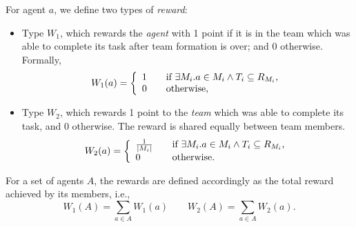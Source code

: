 \documentclass{llncs}
\begin{document}
\begin{definition}[Rewards]
For agent $a$, we define two types of \emph{reward}:
\begin{itemize}
    \item Type $W_1$, which rewards the \emph{agent} with 1 point if it is in the team which was able to complete its task after team formation is over; and 0 otherwise. Formally,
    \begin{equation} \label{eq:w1agent}
W_1(a) = \left\{
  \begin{array}{l l}
    1 & \quad \text{if $\exists M_i . a \in M_i \wedge T_i \subseteq R_{M_i}$,}\\
    0 & \quad \text{otherwise,}\\
  \end{array} \right.
\end{equation}
    \item Type $W_2$, which rewards 1 point to the \emph{team} which was able to complete its task, and 0 otherwise. The reward is shared equally between team members.
\begin{equation}
W_2(a) = \left\{
  \begin{array}{l l}
    \frac{1}{|M_i|} & \quad \text{if $\exists M_i . a \in M_i \wedge T_i \subseteq R_{M_i}$,}\\
    0 & \quad \text{otherwise.}\\
  \end{array} \right.
\label{eq:w2agent}
\end{equation}
\end{itemize}

For a set of agents $A$, the rewards are defined accordingly as the total reward achieved by its members, i.e.,
\begin{equation} \label{eq:w1organisation}
 W_1(A) = \sum_{a \in A} W_1(a) \qquad
%
 W_2(A) = \sum_{a \in A} W_2(a).
\end{equation}
\end{definition}
\end{document}
